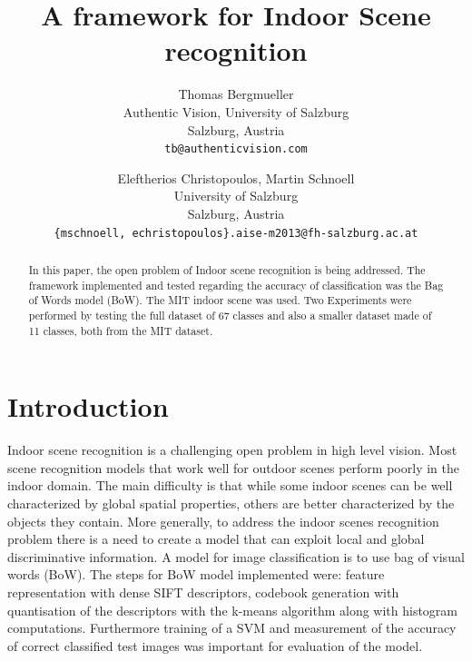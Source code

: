 \documentclass[10pt,twocolumn,letterpaper]{article}
\begin{document}
\title{A framework for Indoor Scene recognition}

\author{Thomas Bergmueller\\
Authentic Vision, University of Salzburg\\
Salzburg, Austria\\
{\tt\small tb@authenticvision.com}
\and
Eleftherios Christopoulos, Martin Schnoell\\
University of Salzburg\\
Salzburg, Austria\\
{\tt\small \{mschnoell, echristopoulos\}.aise-m2013@fh-salzburg.ac.at}
}

\maketitle
\thispagestyle{empty}

\begin{abstract}
   In this paper, the open problem of Indoor scene recognition is being addressed. The framework implemented and tested regarding the accuracy of classification was the Bag of Words model (BoW). The MIT indoor scene was used. Two Experiments were performed by testing the full dataset of 67 classes and also a smaller dataset made of 11 classes, both from the MIT dataset.   
\end{abstract}

\section{Introduction}
Indoor scene recognition is a challenging open problem in high level vision. Most scene recognition models that work well for outdoor scenes perform poorly in the indoor domain. The main difficulty is that while some indoor scenes can be well characterized by global spatial properties, others are better characterized by the objects they contain. More generally, to address the indoor scenes recognition problem there is a need to create a model that can exploit local and global discriminative information.\cite{indoorScenes} A model for image classification is to use bag of visual words (BoW). The steps for BoW model implemented were: feature representation with dense SIFT descriptors, codebook generation with quantisation of the descriptors with the k-means algorithm along with histogram computations. Furthermore training of a SVM and measurement of  the accuracy of correct classified test images was important for evaluation of the model.
\end{document}

